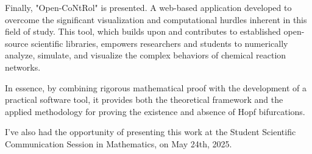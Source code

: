 Finally, "Open-CoNtRol" is presented. A web-based application developed to overcome the significant visualization and computational hurdles inherent in this field of study. This tool, which builds upon and contributes to established open-source scientific libraries, empowers researchers and students to numerically analyze, simulate, and visualize the complex behaviors of chemical reaction networks.

In essence,  by combining rigorous mathematical proof with the development of a practical software tool, it provides both the theoretical framework and the applied methodology for proving the existence and absence of Hopf bifurcations.

I've also had the opportunity of presenting this work at the Student Scientific Communication Session in Mathematics, on May 24th, 2025.